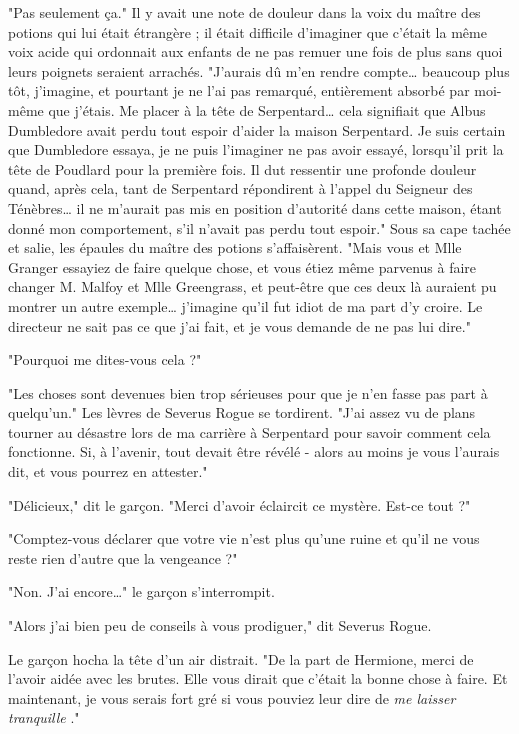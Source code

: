 "Pas seulement ça." Il y avait une note de douleur dans la voix du maître des potions qui lui était étrangère ; il était difficile d'imaginer que c'était la même voix acide qui ordonnait aux enfants de ne pas remuer une fois de plus sans quoi leurs poignets seraient arrachés. "J'aurais dû m'en rendre compte… beaucoup plus tôt, j'imagine, et pourtant je ne l'ai pas remarqué, entièrement absorbé par moi-même que j'étais. Me placer à la tête de Serpentard… cela signifiait que Albus Dumbledore avait perdu tout espoir d'aider la maison Serpentard. Je suis certain que Dumbledore essaya, je ne puis l'imaginer ne pas avoir essayé, lorsqu'il prit la tête de Poudlard pour la première fois. Il dut ressentir une profonde douleur quand, après cela, tant de Serpentard répondirent à l'appel du Seigneur des Ténèbres… il ne m'aurait pas mis en position d'autorité dans cette maison, étant donné mon comportement, s'il n'avait pas perdu tout espoir." Sous sa cape tachée et salie, les épaules du maître des potions s'affaisèrent. "Mais vous et Mlle Granger essayiez de faire quelque chose, et vous étiez même parvenus à faire changer M. Malfoy et Mlle Greengrass, et peut-être que ces deux là auraient pu montrer un autre exemple… j'imagine qu'il fut idiot de ma part d'y croire. Le directeur ne sait pas ce que j'ai fait, et je vous demande de ne pas lui dire."

"Pourquoi me dites-vous cela ?"

"Les choses sont devenues bien trop sérieuses pour que je n'en fasse pas part à quelqu'un." Les lèvres de Severus Rogue se tordirent. "J'ai assez vu de plans tourner au désastre lors de ma carrière à Serpentard pour savoir comment cela fonctionne. Si, à l'avenir, tout devait être révélé - alors au moins je vous l'aurais dit, et vous pourrez en attester."

"Délicieux," dit le garçon. "Merci d'avoir éclaircit ce mystère. Est-ce tout ?"

"Comptez-vous déclarer que votre vie n'est plus qu'une ruine et qu'il ne vous reste rien d'autre que la vengeance ?"

"Non. J'ai encore…" le garçon s'interrompit.

"Alors j'ai bien peu de conseils à vous prodiguer," dit Severus Rogue.

Le garçon hocha la tête d'un air distrait. "De la part de Hermione, merci de l'avoir aidée avec les brutes. Elle vous dirait que c'était la bonne chose à faire. Et maintenant, je vous serais fort gré si vous pouviez leur dire de \emph{me laisser tranquille} ."

